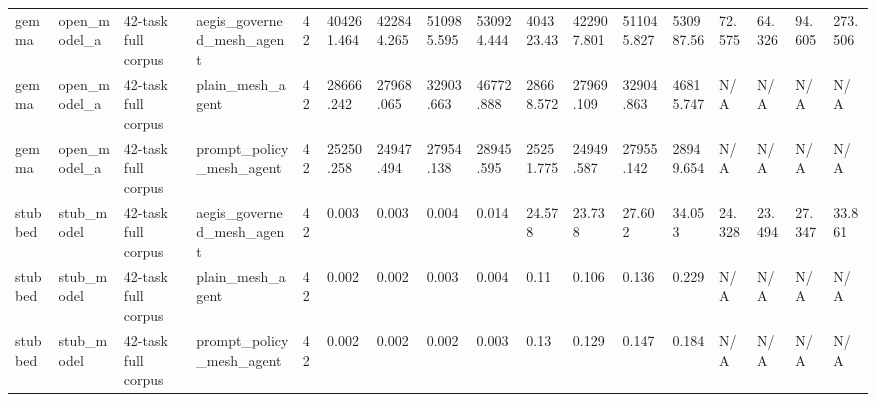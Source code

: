 \begin{tabular}{lllllllllllllllll}
gemma & open\_model\_a & 42-task full corpus & aegis\_governed\_mesh\_agent & 42 & 404261.464 & 422844.265 & 510985.595 & 530924.444 & 404323.43 & 422907.801 & 511045.827 & 530987.56 & 72.575 & 64.326 & 94.605 & 273.506 \\
gemma & open\_model\_a & 42-task full corpus & plain\_mesh\_agent & 42 & 28666.242 & 27968.065 & 32903.663 & 46772.888 & 28668.572 & 27969.109 & 32904.863 & 46815.747 & N/A & N/A & N/A & N/A \\
gemma & open\_model\_a & 42-task full corpus & prompt\_policy\_mesh\_agent & 42 & 25250.258 & 24947.494 & 27954.138 & 28945.595 & 25251.775 & 24949.587 & 27955.142 & 28949.654 & N/A & N/A & N/A & N/A \\
stubbed & stub\_model & 42-task full corpus & aegis\_governed\_mesh\_agent & 42 & 0.003 & 0.003 & 0.004 & 0.014 & 24.578 & 23.738 & 27.602 & 34.053 & 24.328 & 23.494 & 27.347 & 33.861 \\
stubbed & stub\_model & 42-task full corpus & plain\_mesh\_agent & 42 & 0.002 & 0.002 & 0.003 & 0.004 & 0.11 & 0.106 & 0.136 & 0.229 & N/A & N/A & N/A & N/A \\
stubbed & stub\_model & 42-task full corpus & prompt\_policy\_mesh\_agent & 42 & 0.002 & 0.002 & 0.002 & 0.003 & 0.13 & 0.129 & 0.147 & 0.184 & N/A & N/A & N/A & N/A \\
 \hline
\end{tabular}
